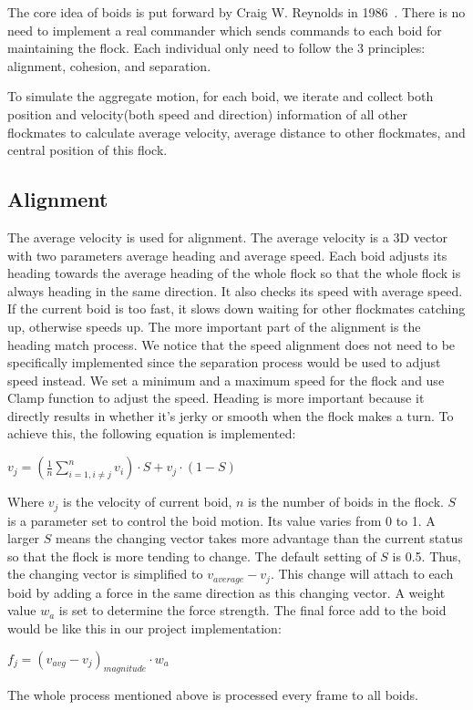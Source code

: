 The core idea of boids is put forward by Craig W. Reynolds in 1986~\cite{Reynolds:1987}. There is no need to implement a real commander which sends commands to each boid for maintaining the flock. Each individual only need to follow the 3 principles: alignment, cohesion, and separation.

To simulate the aggregate motion, for each boid, we iterate and collect both position and velocity(both speed and direction) information of all other flockmates to calculate average velocity, average distance to other flockmates, and central position of this flock. 

\subsection{Alignment}
The average velocity is used for alignment. The average velocity is a 3D vector with two parameters average heading and average speed. Each boid adjusts its heading towards the average heading of the whole flock so that the whole flock is always heading in the same direction. It also checks its speed with average speed. If the current boid is too fast, it slows down waiting for other flockmates catching up, otherwise speeds up. The more important part of the alignment is the heading match process. We notice that the speed alignment does not need to be specifically implemented since the separation process would be used to adjust speed instead. We set a minimum and a maximum speed for the flock and use Clamp function to adjust the speed. Heading is more important because it directly results in whether it’s jerky or smooth when the flock makes a turn. To achieve this, the following equation is implemented:
\vspace{3mm}
\begin{center}
$v_j = (\frac{1}{n}\sum_{i=1,i\neq{j}}^{n}{v_i})\cdot S + v_j \cdot (1-S)$
\end{center}
\vspace{3mm}
Where $v_j$ is the velocity of current boid, $n$ is the number of boids in the flock. $S$ is a parameter set to control the boid motion. Its value varies from 0 to 1. A larger $S$ means the changing vector takes more advantage than the current status so that the flock is more tending to change. The default setting of $S$ is 0.5. Thus, the changing vector is simplified to $v_{average} - v_j$. This change will attach to each boid by adding a force in the same direction as this changing vector. A weight value $w_a$ is set to determine the force strength. The final force add to the boid would be like this in our project implementation:
\vspace{3mm}
\begin{center}
$f_j = (v_{avg} - v_j)_{magnitude} \cdot w_a$
\end{center}
\vspace{3mm}
The whole process mentioned above is processed every frame to all boids.
